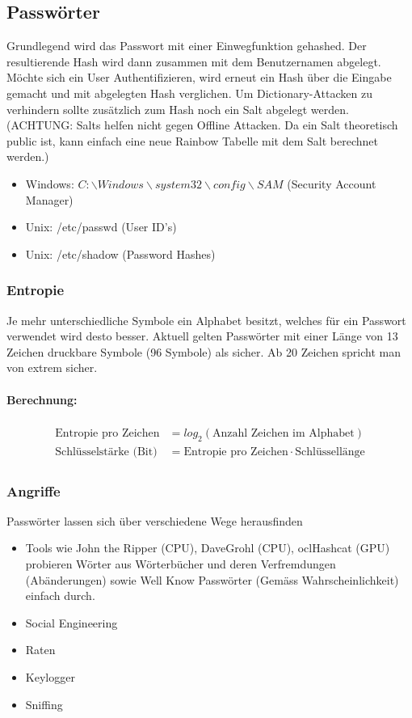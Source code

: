 \subsection{Passwörter}
Grundlegend wird das Passwort mit einer Einwegfunktion gehashed. Der resultierende Hash wird dann zusammen mit dem Benutzernamen abgelegt. Möchte sich ein User Authentifizieren, wird erneut ein Hash über die Eingabe gemacht und mit abgelegten Hash verglichen. Um Dictionary-Attacken zu verhindern sollte zusätzlich zum Hash noch ein Salt abgelegt werden. (ACHTUNG: Salts helfen nicht gegen Offline Attacken. Da ein Salt theoretisch public ist, kann einfach eine neue Rainbow Tabelle mit dem Salt berechnet werden.)

\begin{itemize}
	\item Windows: $C:\backslash Windows\backslash system32\backslash config\backslash SAM$ (Security Account Manager)
	\item Unix: /etc/passwd (User ID's)
	\item Unix: /etc/shadow (Password Hashes)
\end{itemize}

\subsubsection{Entropie}
Je mehr unterschiedliche Symbole ein Alphabet besitzt, welches für ein Passwort verwendet wird desto besser. Aktuell gelten Passwörter mit einer Länge von 13 Zeichen druckbare Symbole (96 Symbole) als sicher. Ab 20 Zeichen spricht man von extrem sicher.

\paragraph{Berechnung:}
\begin{align}
	\begin{split}
	\text{Entropie pro Zeichen} &= log_2(\text{Anzahl Zeichen im Alphabet}) \\
	\text{Schlüsselstärke (Bit)} &=  \text{Entropie pro Zeichen} \cdot \text{Schlüssellänge}
	\end{split}
\end{align}

\subsubsection{Angriffe}
Passwörter lassen sich über verschiedene Wege herausfinden
\begin{itemize}
	\item Tools wie John the Ripper (CPU), DaveGrohl (CPU), oclHashcat (GPU) probieren Wörter aus Wörterbücher und deren Verfremdungen (Abänderungen) sowie Well Know Passwörter (Gemäss Wahrscheinlichkeit) einfach durch.
	\item Social Engineering
	\item Raten
	\item Keylogger
	\item Sniffing
\end{itemize}

